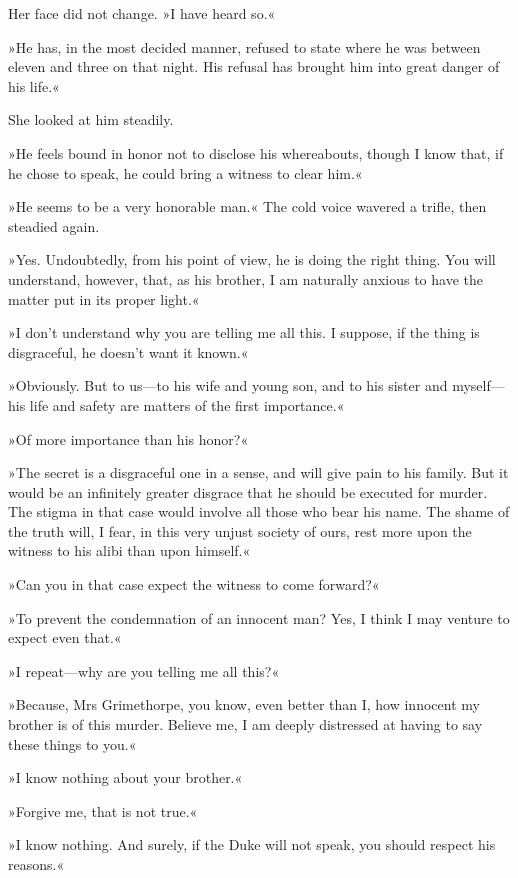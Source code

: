Her face did not change. »I have heard so.«

»He has, in the most decided manner, refused to state where he was between eleven and three on that night. His refusal has brought him into great danger of his life.«

She looked at him steadily.

»He feels bound in honor not to disclose his whereabouts, though I know that, if he chose to speak, he could bring a witness to clear him.«

»He seems to be a very honorable man.« The cold voice wavered a trifle, then steadied again.

»Yes. Undoubtedly, from his point of view, he is doing the right thing. You will understand, however, that, as his brother, I am naturally anxious to have the matter put in its proper light.«

»I don't understand why you are telling me all this. I suppose, if the thing is disgraceful, he doesn't want it known.«

»Obviously. But to us\allowbreak---\allowbreak to his wife and young son, and to his sister and myself\allowbreak---\allowbreak his life and safety are matters of the first importance.«

»Of more importance than his honor?«

»The secret is a disgraceful one in a sense, and will give pain to his family. But it would be an infinitely greater disgrace that he should be executed for murder. The stigma in that case would involve all those who bear his name. The shame of the truth will, I fear, in this very unjust society of ours, rest more upon the witness to his alibi than upon himself.«

»Can you in that case expect the witness to come forward?«

»To prevent the condemnation of an innocent man? Yes, I think I may venture to expect even that.«

»I repeat\allowbreak---\allowbreak why are you telling me all this?«

»Because, Mrs Grimethorpe, you know, even better than I, how innocent my brother is of this murder. Believe me, I am deeply distressed at having to say these things to you.«

»I know nothing about your brother.«

»Forgive me, that is not true.«

»I know nothing. And surely, if the Duke will not speak, you should respect his reasons.«

